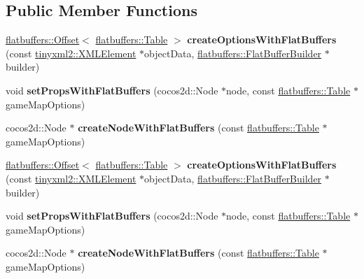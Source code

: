 \subsection*{Public Member Functions}
\begin{DoxyCompactItemize}
\item 
\mbox{\label{classcocostudio_1_1GameMapReader_a37af31ae109b2cebb0f1080103b0ce1b}} 
\hyperlink{structflatbuffers_1_1Offset}{flatbuffers\+::\+Offset}$<$ \hyperlink{classflatbuffers_1_1Table}{flatbuffers\+::\+Table} $>$ {\bfseries create\+Options\+With\+Flat\+Buffers} (const \hyperlink{classtinyxml2_1_1XMLElement}{tinyxml2\+::\+X\+M\+L\+Element} $\ast$object\+Data, \hyperlink{classflatbuffers_1_1FlatBufferBuilder}{flatbuffers\+::\+Flat\+Buffer\+Builder} $\ast$builder)
\item 
\mbox{\label{classcocostudio_1_1GameMapReader_af3eff932154f63da2cbfd72e43149e1f}} 
void {\bfseries set\+Props\+With\+Flat\+Buffers} (cocos2d\+::\+Node $\ast$node, const \hyperlink{classflatbuffers_1_1Table}{flatbuffers\+::\+Table} $\ast$game\+Map\+Options)
\item 
\mbox{\label{classcocostudio_1_1GameMapReader_a96b89f08f7ab31ce7a6052766d292dea}} 
cocos2d\+::\+Node $\ast$ {\bfseries create\+Node\+With\+Flat\+Buffers} (const \hyperlink{classflatbuffers_1_1Table}{flatbuffers\+::\+Table} $\ast$game\+Map\+Options)
\item 
\mbox{\label{classcocostudio_1_1GameMapReader_a2fd88688828fb5115ff52938ca244be2}} 
\hyperlink{structflatbuffers_1_1Offset}{flatbuffers\+::\+Offset}$<$ \hyperlink{classflatbuffers_1_1Table}{flatbuffers\+::\+Table} $>$ {\bfseries create\+Options\+With\+Flat\+Buffers} (const \hyperlink{classtinyxml2_1_1XMLElement}{tinyxml2\+::\+X\+M\+L\+Element} $\ast$object\+Data, \hyperlink{classflatbuffers_1_1FlatBufferBuilder}{flatbuffers\+::\+Flat\+Buffer\+Builder} $\ast$builder)
\item 
\mbox{\label{classcocostudio_1_1GameMapReader_af3eff932154f63da2cbfd72e43149e1f}} 
void {\bfseries set\+Props\+With\+Flat\+Buffers} (cocos2d\+::\+Node $\ast$node, const \hyperlink{classflatbuffers_1_1Table}{flatbuffers\+::\+Table} $\ast$game\+Map\+Options)
\item 
\mbox{\label{classcocostudio_1_1GameMapReader_a5fa69e4a7fb1926f229aa1ec54083f92}} 
cocos2d\+::\+Node $\ast$ {\bfseries create\+Node\+With\+Flat\+Buffers} (const \hyperlink{classflatbuffers_1_1Table}{flatbuffers\+::\+Table} $\ast$game\+Map\+Options)
\end{DoxyCompactItemize}

